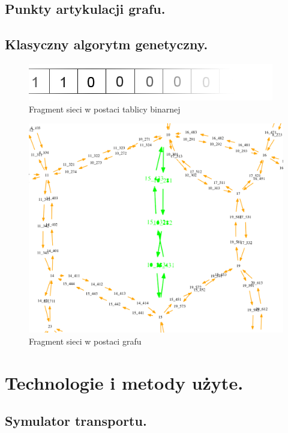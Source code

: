\documentclass[twoside,12pt]{report}
\let\oldsection\chapter
\def\chapter{\cleardoublepage\oldsection}
\begin{document}
\section{Punkty artykulacji grafu.}


\section{Klasyczny algorytm genetyczny.}


\begin{figure}[ht]
\includegraphics[width=\textwidth]{img/bool}
\caption{Fragment sieci w postaci tablicy binarnej }
\end{figure}

\begin{figure}[ht]
\includegraphics[width=\textwidth]{img/bool-efect}
\caption{Fragment sieci w postaci grafu}
\end{figure}


\chapter{Technologie i metody użyte.}\label{rozdz.technologie} 
\section{Symulator transportu.}
\end{document}

